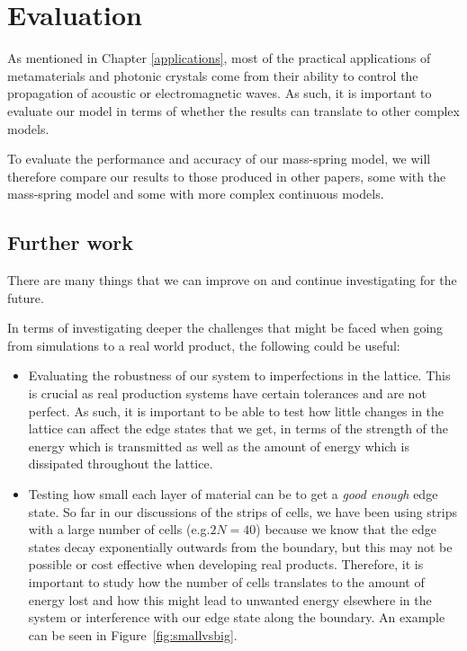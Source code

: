 \chapter{Evaluation}
As mentioned in Chapter \ref{applications}, most of the practical applications
of metamaterials and photonic crystals come from their ability to control the
propagation of acoustic or electromagnetic waves. As such, it is important to
evaluate our model in terms of whether the results can translate to other
complex models.

To evaluate the performance and accuracy of our mass-spring model, we will
therefore compare our results to those produced in other papers, some with the
mass-spring model and some with more complex continuous models.

\section{Further work}
There are many things that we can improve on and continue investigating for the
future. 

In terms of investigating deeper the challenges that might be faced when going
from simulations to a real world product, the following could be useful:
\begin{itemize}
\item Evaluating the robustness of our system to imperfections in the lattice.
This is crucial as real production systems have certain tolerances and are not
perfect. As such, it is important to be able to test how little changes in the
lattice can affect the edge states that we get, in terms of the strength of the
energy which is transmitted as well as the amount of energy which is dissipated
throughout the lattice.

\item Testing how small each layer of material can be to get a \textit{good
enough} edge state. So far in our discussions of the strips of cells, we have
been using strips with a large number of cells (e.g.$2N=40$) because we know
that the edge states decay exponentially outwards from the boundary, but this
may not be possible or cost effective when developing real products. Therefore,
it is important to study how the number of cells translates to the amount of
energy lost and how this might lead to unwanted energy elsewhere in the system
or interference with our edge state along the boundary. An example can be seen
in Figure~\ref{fig:smallvsbig}.
\end{itemize}

